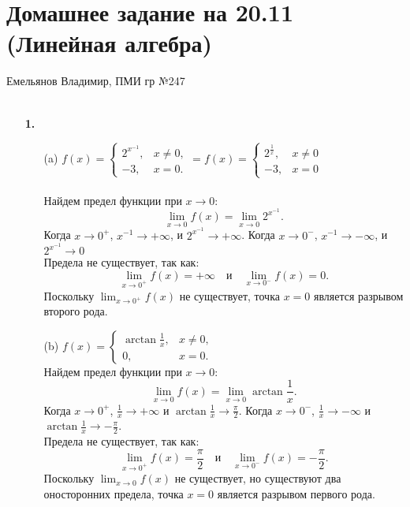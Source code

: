 \documentclass[a4paper]{article}
\renewcommand{\f}[2]{\frac{#1}{#2}}
\begin{document}
\section*{Домашнее задание на 20.11 (Линейная алгебра)}
 {\large Емельянов Владимир, ПМИ гр №247}\\\\
\begin{enumerate}
    \item[\textbf{1.}]
    \begin{enumerate}
        \item[(a)]$f(x) = \begin{cases}
            2^{x^{-1}}, & x \neq 0, \\
            -3,         & x = 0.
        \end{cases} = f(x) = \begin{cases}
            2^{\f{1}{x}}, & x \neq 0\\
            -3, & x = 0
        \end{cases}$\\\\
        Найдем предел функции при $ x \to 0 $:
        $$
        \lim_{x \to 0} f(x) = \lim_{x \to 0} 2^{x^{-1}}.
        $$
        Когда $ x \to 0^+ $, $ x^{-1} \to +\infty $, и $ 2^{x^{-1}} \to +\infty $. Когда $ x \to 0^- $, $ x^{-1} \to -\infty $, и $ 2^{x^{-1}} \to 0 $\\
        Предела не существует, так как:
        $$
        \lim_{x \to 0^+} f(x) = +\infty \quad \text{и} \quad \lim_{x \to 0^-} f(x) = 0.
        $$
        Поскольку $ \lim_{x \to 0^+} f(x) $ не существует, точка $ x = 0 $ является разрывом второго рода.\\
    
        \item[(b)]$f(x) = \begin{cases}
            \arctan \frac{1}{x}, & x \neq 0, \\
            0, & x = 0.
        \end{cases}$\\
        Найдем предел функции при $ x \to 0 $:
        $$
        \lim_{x \to 0} f(x) = \lim_{x \to 0} \arctan \frac{1}{x}.
        $$
        Когда $ x \to 0^+ $, $ \frac{1}{x} \to +\infty $ и $ \arctan \frac{1}{x} \to \frac{\pi}{2} $. Когда $ x \to 0^- $, $ \frac{1}{x} \to -\infty $ и $ \arctan \frac{1}{x} \to -\frac{\pi}{2} $.\\
        Предела не существует, так как:
        $$
        \lim_{x \to 0^+} f(x) = \frac{\pi}{2} \quad \text{и} \quad \lim_{x \to 0^-} f(x) = -\frac{\pi}{2}.
        $$
        Поскольку $ \lim_{x \to 0} f(x) $ не существует, но существуют два оносторонних предела, точка $ x = 0 $ является разрывом первого рода.\\


\end{enumerate}
\end{enumerate}
\end{document}
